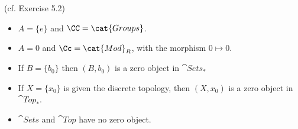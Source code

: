 \begin{examples*}(cf. Exercise 5.2)%
%  
\renewcommand{\labelitemi}{$\square$}
\begin{itemize}
  \item $A=\{e\}$ and $\CC=\cat{Groups}$.
  \item $A=0$ and $\Cc=\cat{Mod}_R$, with the morphism $0\mapsto 0$.
  \item If $B=\{b_0\}$ then $(B,b_0)$ is a zero object in $\cat{Sets}_*$
  \item If $X=\{x_0\}$ is given the discrete topology, then $(X,x_0)$ is a zero object in
    $\cat{Top}_*$.
\end{itemize}%
%
% 
\renewcommand{\labelitemi}{$\boxtimes$}
\begin{itemize}
\item $\cat{Sets}$ and $\cat{Top}$ have no zero object.
\end{itemize}
%
%  
\end{examples*}